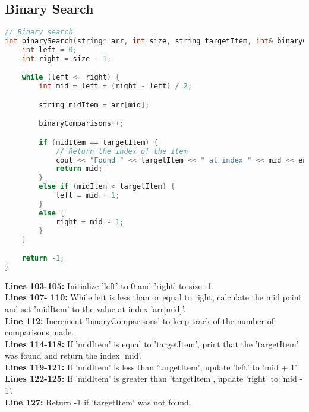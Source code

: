 \documentclass[letterpaper, 10pt,DIV=13]{scrartcl}
\numberwithin{equation}{section} %
\numberwithin{figure}{section} %
\numberwithin{table}{section} %
\begin{document}
\subsection{Binary Search}

\begin{linenumbers}
\begin{lstlisting}[language=C++, caption={Binary Search}, label={code:example}]
// Binary search
int binarySearch(string* arr, int size, string targetItem, int& binaryComparisons) {
    int left = 0;
    int right = size - 1;

    while (left <= right) {
        int mid = left + (right - left) / 2;

        string midItem = arr[mid];

        binaryComparisons++;

        if (midItem == targetItem) {
            // Return the index of the item
            cout << "Found " << targetItem << " at index " << mid << endl;
            return mid;
        }
        else if (midItem < targetItem) {
            left = mid + 1;
        }
        else {
            right = mid - 1;
        }
    }

    return -1;
}
\end{lstlisting}
\end{linenumbers}
\nolinenumbers

\textbf{Lines 103-105:} Initialize 'left' to 0 and 'right' to size -1. \\
\textbf{Lines 107- 110:} While left is less than or equal to right, calculate the mid point and set 'midItem' to the value at index 'arr[mid]'. \\
\textbf{Line 112:} Increment 'binaryComparisons' to keep track of the number of comparisons made. \\
\textbf{Lines 114-118:} If 'midItem' is equal to 'targetItem', print that the 'targetItem' was found and return the index 'mid'. \\
\textbf{Lines 119-121:} If 'midItem' is less than 'targetItem', update 'left' to 'mid + 1'. \\
\textbf{Lines 122-125:} If 'midItem' is greater than 'targetItem', update 'right' to 'mid - 1'. \\
\textbf{Line 127:} Return -1 if 'targetItem' was not found.

\end{document}
